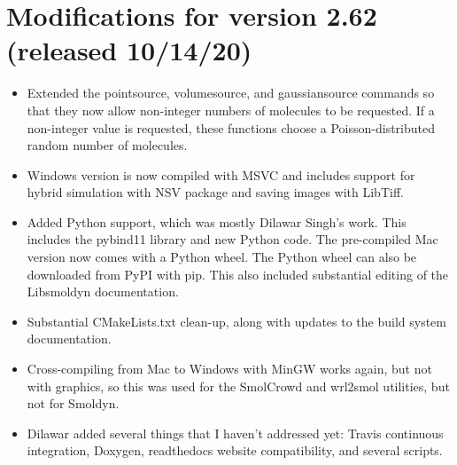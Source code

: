 \documentclass {scrbook}
\begin{document}
\section{Modifications for version 2.62 (released 10/14/20)}
\begin{itemize}
\item Extended the pointsource, volumesource, and gaussiansource commands so that they now allow non-integer numbers of molecules to be requested. If a non-integer value is requested, these functions choose a Poisson-distributed random number of molecules.
\item Windows version is now compiled with MSVC and includes support for hybrid simulation with NSV package and saving images with LibTiff.
\item Added Python support, which was mostly Dilawar Singh's work. This includes the pybind11 library and new Python code. The pre-compiled Mac version now comes with a Python wheel. The Python wheel can also be downloaded from PyPI with pip. This also included substantial editing of the Libsmoldyn documentation.
\item Substantial CMakeLists.txt clean-up, along with updates to the build system documentation.
\item Cross-compiling from Mac to Windows with MinGW works again, but not with graphics, so this was used for the SmolCrowd and wrl2smol utilities, but not for Smoldyn.
\item Dilawar added several things that I haven't addressed yet: Travis continuous integration, Doxygen, readthedocs website compatibility, and several scripts.
\end{itemize}
\end{document}
